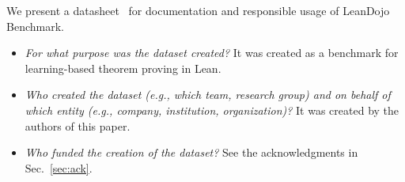 We present a datasheet~\cite{gebru2021datasheets} for documentation and responsible usage of LeanDojo Benchmark.



\begin{itemize}
\item \emph{For what purpose was the dataset created?} It was created as a benchmark for learning-based theorem proving in Lean.

\item \emph{Who created the dataset (e.g., which team, research group) and on behalf of which entity (e.g., company, institution, organization)?} It was created by the authors of this paper.

\item \emph{Who funded the creation of the dataset?} See the acknowledgments in Sec.~\ref{sec:ack}.

\end{itemize}


